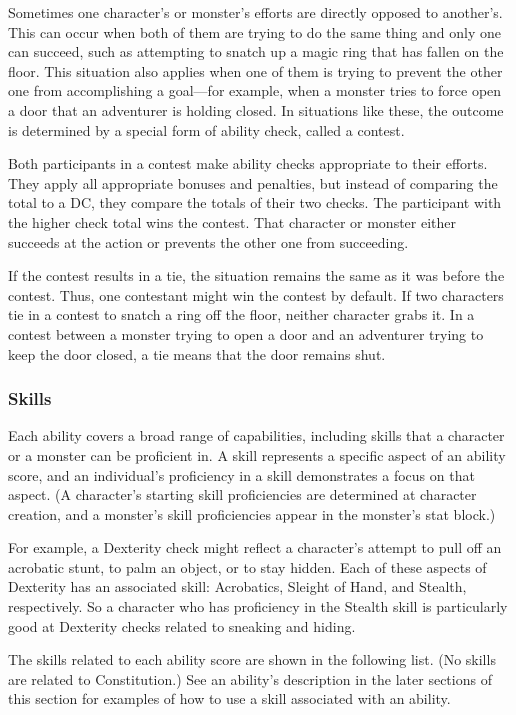\documentclass[
]{article}
\begin{document}
Sometimes one character's or monster's efforts are directly opposed to
another's. This can occur when both of them are trying to do the same
thing and only one can succeed, such as attempting to snatch up a magic
ring that has fallen on the floor. This situation also applies when one
of them is trying to prevent the other one from accomplishing a
goal---for example, when a monster tries to force open a door that an
adventurer is holding closed. In situations like these, the outcome is
determined by a special form of ability check, called a contest.

Both participants in a contest make ability checks appropriate to their
efforts. They apply all appropriate bonuses and penalties, but instead
of comparing the total to a DC, they compare the totals of their two
checks. The participant with the higher check total wins the contest.
That character or monster either succeeds at the action or prevents the
other one from succeeding.

If the contest results in a tie, the situation remains the same as it
was before the contest. Thus, one contestant might win the contest by
default. If two characters tie in a contest to snatch a ring off the
floor, neither character grabs it. In a contest between a monster trying
to open a door and an adventurer trying to keep the door closed, a tie
means that the door remains shut.

\hypertarget{skills}{%
\subsubsection{Skills}\label{skills}}

Each ability covers a broad range of capabilities, including skills that
a character or a monster can be proficient in. A skill represents a
specific aspect of an ability score, and an individual's proficiency in
a skill demonstrates a focus on that aspect. (A character's starting
skill proficiencies are determined at character creation, and a
monster's skill proficiencies appear in the monster's stat block.)

For example, a Dexterity check might reflect a character's attempt to
pull off an acrobatic stunt, to palm an object, or to stay hidden. Each
of these aspects of Dexterity has an associated skill: Acrobatics,
Sleight of Hand, and Stealth, respectively. So a character who has
proficiency in the Stealth skill is particularly good at Dexterity
checks related to sneaking and hiding.

The skills related to each ability score are shown in the following
list. (No skills are related to Constitution.) See an ability's
description in the later sections of this section for examples of how to
use a skill associated with an ability.
\end{document}
